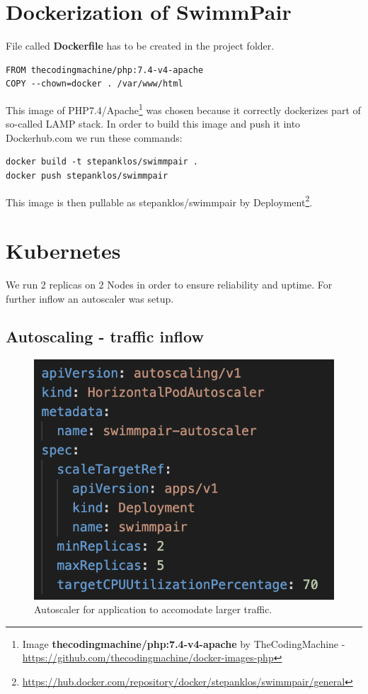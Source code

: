 \section*{Dockerization of SwimmPair}
File called \textbf{Dockerfile} has to be created in the project folder.
\begin{lstlisting}
FROM thecodingmachine/php:7.4-v4-apache
COPY --chown=docker . /var/www/html
\end{lstlisting}
This image of PHP7.4/Apache\footnote{Image \textbf{thecodingmachine/php:7.4-v4-apache}  by TheCodingMachine - \url{https://github.com/thecodingmachine/docker-images-php}} was chosen because it correctly dockerizes part of so-called LAMP stack. In order to build this image and push it into Dockerhub.com we run these commands:
\begin{lstlisting}
docker build -t stepanklos/swimmpair .
docker push stepanklos/swimmpair
\end{lstlisting}
This image is then pullable as stepanklos/swimmpair by Deployment\footnote{\url{https://hub.docker.com/repository/docker/stepanklos/swimmpair/general}}.
\section*{Kubernetes}
We run 2 replicas on 2 Nodes in order to ensure reliability and uptime. For further inflow an autoscaler was setup. 
\subsection*{Autoscaling - traffic inflow}
\begin{figure}[h]
    \centering	
    \includegraphics[scale=0.52]{img/swimmpair_deloyment_k8s_scaling.png}
    \caption{Autoscaler for application to accomodate larger traffic.}
    \label{fig5.2:k8sautoscaling}
\end{figure}
